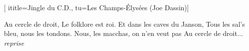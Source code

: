  [
ititle={Jingle du C.D.},
tu={Les Champs-Élysées (Joe Dassin)}]

\beginverse 
Au cercle de droit,
Le folklore est roi.
Et dans les caves du Janson,
Tous les sal's bleu, nous les tondons.
Nous, les macchas, on n'en veut pas
Au cercle de droit... \textit{reprise}
\endverse
\endsong